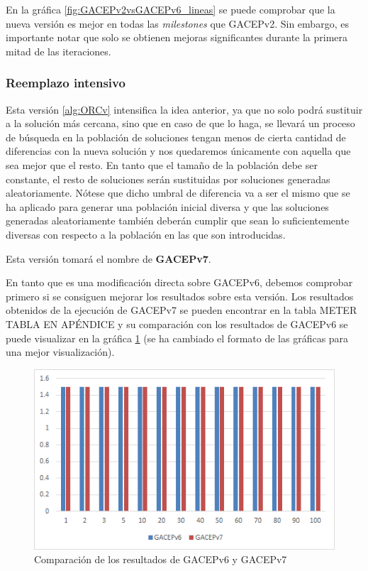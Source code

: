 En la gráfica \ref{fig:GACEPv2vsGACEPv6_lineas} se puede comprobar que la nueva versión es mejor en todas las \textit{milestones} que GACEPv2. 
Sin embargo, es importante notar que solo se obtienen mejoras significantes durante la primera mitad de las iteraciones. 


\subsubsection{Reemplazo intensivo}

Esta versión \ref{alg:ORCv} intensifica la idea anterior, ya que no solo podrá sustituir a la solución más cercana, sino que en caso de que lo haga, se llevará un proceso de búsqueda en la población de soluciones tengan menos de cierta cantidad de diferencias con la nueva solución y nos quedaremos únicamente con aquella que sea mejor que el resto. 
En tanto que el tamaño de la población debe ser constante, el resto de soluciones serán sustituidas por soluciones generadas aleatoriamente. 
Nótese que dicho umbral de diferencia va a ser el mismo que se ha aplicado para generar una población inicial diversa y que las soluciones generadas aleatoriamente también deberán cumplir que sean lo suficientemente diversas con respecto a la población en las que son introducidas. 

Esta versión tomará el nombre de \textbf{GACEPv7}. 

En tanto que es una modificación directa sobre GACEPv6, debemos comprobar primero si se consiguen mejorar los resultados sobre esta versión. 
Los resultados obtenidos de la ejecución de GACEPv7 se pueden encontrar en la tabla \color{red} METER TABLA EN APÉNDICE \color{black} y su comparación con los resultados de GACEPv6 se puede visualizar en la gráfica \ref{fig:GACEPv6vsGACEPv7} (se ha cambiado el formato de las gráficas para una mejor visualización).

\begin{figure}[h]
		\centering
		\includegraphics[scale=1]{imagenes/Experimental/barras/GACEPv6vsGACEPv7.png}
        \caption{Comparación de los resultados de GACEPv6 y GACEPv7}
        \label{fig:GACEPv6vsGACEPv7}
\end{figure}

